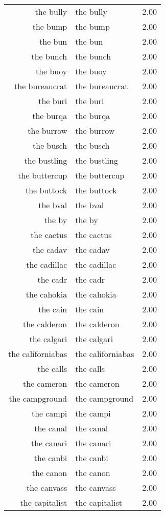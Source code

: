 \begin{table}[ht]
\begin{tabular}{rlr}
  the bully & the bully & 2.00 \\ 
  the bump & the bump & 2.00 \\ 
  the bun & the bun & 2.00 \\ 
  the bunch & the bunch & 2.00 \\ 
  the buoy & the buoy & 2.00 \\ 
  the bureaucrat & the bureaucrat & 2.00 \\ 
  the buri & the buri & 2.00 \\ 
  the burqa & the burqa & 2.00 \\ 
  the burrow & the burrow & 2.00 \\ 
  the busch & the busch & 2.00 \\ 
  the bustling & the bustling & 2.00 \\ 
  the buttercup & the buttercup & 2.00 \\ 
  the buttock & the buttock & 2.00 \\ 
  the bval & the bval & 2.00 \\ 
  the by & the by & 2.00 \\ 
  the cactus & the cactus & 2.00 \\ 
  the cadav & the cadav & 2.00 \\ 
  the cadillac & the cadillac & 2.00 \\ 
  the cadr & the cadr & 2.00 \\ 
  the cahokia & the cahokia & 2.00 \\ 
  the cain & the cain & 2.00 \\ 
  the calderon & the calderon & 2.00 \\ 
  the calgari & the calgari & 2.00 \\ 
  the californiabas & the californiabas & 2.00 \\ 
  the calls & the calls & 2.00 \\ 
  the cameron & the cameron & 2.00 \\ 
  the campground & the campground & 2.00 \\ 
  the campi & the campi & 2.00 \\ 
  the canal & the canal & 2.00 \\ 
  the canari & the canari & 2.00 \\ 
  the canbi & the canbi & 2.00 \\ 
  the canon & the canon & 2.00 \\ 
  the canvass & the canvass & 2.00 \\ 
  the capitalist & the capitalist & 2.00 \\ 

\end{tabular}
\end{table}
